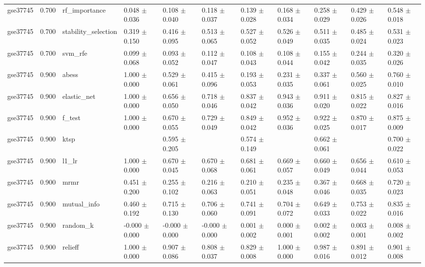 \begin{table}[t]
\begin{tabular}{lllllllllll}
    gse37745 & 0.700 & rf\_importance & 0.048 $\pm$ 0.036 & 0.108 $\pm$ 0.040 & 0.118 $\pm$ 0.037 & 0.139 $\pm$ 0.028 & 0.168 $\pm$ 0.034 & 0.258 $\pm$ 0.029 & 0.429 $\pm$ 0.026 & 0.548 $\pm$ 0.018 \\
    gse37745 & 0.700 & stability\_selection & 0.319 $\pm$ 0.150 & 0.416 $\pm$ 0.095 & 0.513 $\pm$ 0.065 & 0.527 $\pm$ 0.052 & 0.526 $\pm$ 0.049 & 0.511 $\pm$ 0.035 & 0.485 $\pm$ 0.024 & 0.531 $\pm$ 0.023 \\
    gse37745 & 0.700 & svm\_rfe & 0.099 $\pm$ 0.068 & 0.093 $\pm$ 0.052 & 0.112 $\pm$ 0.047 & 0.108 $\pm$ 0.043 & 0.108 $\pm$ 0.044 & 0.155 $\pm$ 0.042 & 0.244 $\pm$ 0.035 & 0.320 $\pm$ 0.026 \\
    gse37745 & 0.900 & abess & 1.000 $\pm$ 0.000 & 0.529 $\pm$ 0.061 & 0.415 $\pm$ 0.096 & 0.193 $\pm$ 0.053 & 0.231 $\pm$ 0.035 & 0.337 $\pm$ 0.061 & 0.560 $\pm$ 0.025 & 0.760 $\pm$ 0.010 \\
    gse37745 & 0.900 & elastic\_net & 1.000 $\pm$ 0.000 & 0.656 $\pm$ 0.050 & 0.718 $\pm$ 0.046 & 0.837 $\pm$ 0.042 & 0.943 $\pm$ 0.036 & 0.911 $\pm$ 0.020 & 0.815 $\pm$ 0.022 & 0.827 $\pm$ 0.016 \\
    gse37745 & 0.900 & f\_test & 1.000 $\pm$ 0.000 & 0.670 $\pm$ 0.055 & 0.729 $\pm$ 0.049 & 0.849 $\pm$ 0.042 & 0.952 $\pm$ 0.036 & 0.922 $\pm$ 0.025 & 0.870 $\pm$ 0.017 & 0.875 $\pm$ 0.009 \\
    gse37745 & 0.900 & ktsp &  & 0.595 $\pm$ 0.205 &  & 0.574 $\pm$ 0.149 &  & 0.662 $\pm$ 0.061 &  & 0.700 $\pm$ 0.022 \\
    gse37745 & 0.900 & l1\_lr & 1.000 $\pm$ 0.000 & 0.670 $\pm$ 0.045 & 0.670 $\pm$ 0.068 & 0.681 $\pm$ 0.061 & 0.669 $\pm$ 0.057 & 0.660 $\pm$ 0.049 & 0.656 $\pm$ 0.044 & 0.610 $\pm$ 0.053 \\
    gse37745 & 0.900 & mrmr & 0.451 $\pm$ 0.200 & 0.255 $\pm$ 0.102 & 0.216 $\pm$ 0.063 & 0.210 $\pm$ 0.051 & 0.235 $\pm$ 0.048 & 0.367 $\pm$ 0.046 & 0.668 $\pm$ 0.035 & 0.720 $\pm$ 0.023 \\
    gse37745 & 0.900 & mutual\_info & 0.460 $\pm$ 0.192 & 0.715 $\pm$ 0.130 & 0.706 $\pm$ 0.060 & 0.741 $\pm$ 0.091 & 0.704 $\pm$ 0.072 & 0.649 $\pm$ 0.033 & 0.753 $\pm$ 0.022 & 0.835 $\pm$ 0.016 \\
    gse37745 & 0.900 & random\_k & -0.000 $\pm$ 0.000 & -0.000 $\pm$ 0.000 & -0.000 $\pm$ 0.000 & 0.001 $\pm$ 0.002 & 0.000 $\pm$ 0.001 & 0.002 $\pm$ 0.002 & 0.003 $\pm$ 0.001 & 0.008 $\pm$ 0.002 \\
    gse37745 & 0.900 & relieff & 1.000 $\pm$ 0.000 & 0.907 $\pm$ 0.086 & 0.808 $\pm$ 0.037 & 0.829 $\pm$ 0.008 & 1.000 $\pm$ 0.000 & 0.987 $\pm$ 0.016 & 0.891 $\pm$ 0.012 & 0.901 $\pm$ 0.008 \\

\end{tabular}
\end{table}
